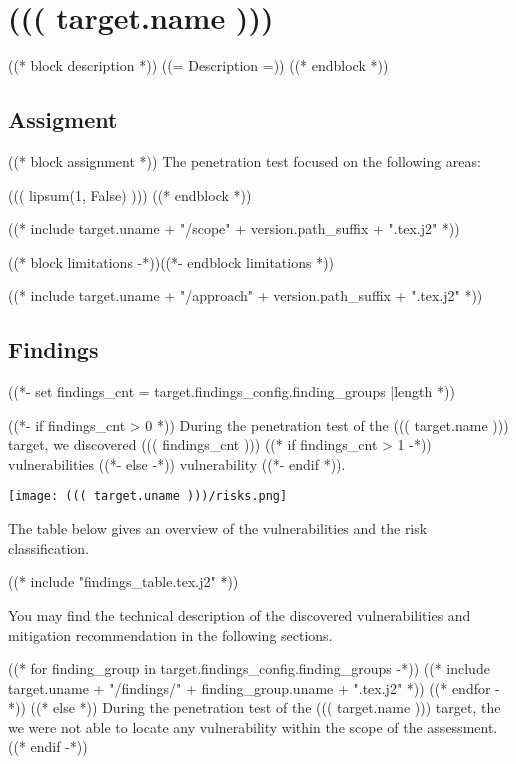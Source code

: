 \chapter{((( target.name )))}
\label{((( target.uname )))}

((* block description *))
  ((= Description =))
((* endblock *))

\section{Assigment}

((* block assignment *))
  The penetration test focused on the following areas:

  ((( lipsum(1, False) )))
((* endblock *))

((* include target.uname + "/scope" + version.path_suffix + ".tex.j2" *))

((* block limitations -*))((*- endblock limitations *))

((* include target.uname + "/approach" + version.path_suffix + ".tex.j2" *))

\section{Findings}
((*- set findings_cnt = target.findings_config.finding_groups |length *))

((*- if findings_cnt > 0 *))
  During the penetration test of the ((( target.name ))) target, we discovered ((( findings_cnt ))) ((* if findings_cnt > 1 -*)) vulnerabilities ((*- else -*)) vulnerability ((*- endif *)).

  \begin{center}
    \texttt{[image: ((( target.uname )))/risks.png]}
  \end{center}

  The table below gives an overview of the vulnerabilities and the risk classification.

  ((* include "findings_table.tex.j2" *))

  You may find the technical description of the discovered vulnerabilities and mitigation recommendation in the following sections.

  ((* for finding_group in target.findings_config.finding_groups -*))
    \clearpage
    ((* include target.uname + "/findings/" + finding_group.uname + ".tex.j2" *))
  ((* endfor -*))
((* else *))
  During the penetration test of the ((( target.name ))) target, the we were not able to locate any vulnerability within the scope of the assessment.
((* endif -*))
